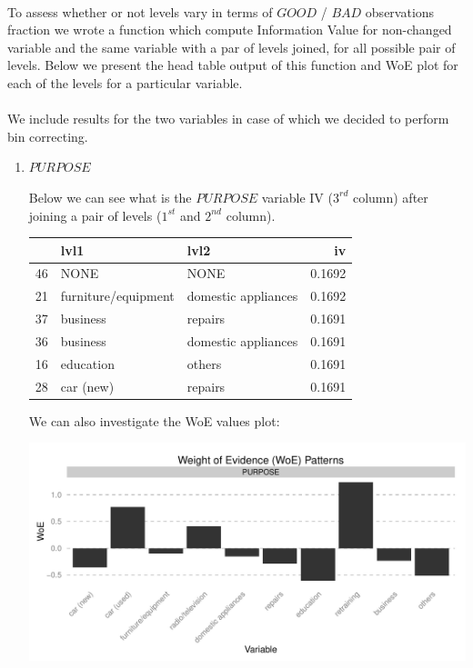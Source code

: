 \documentclass[10pt]{article}\usepackage[]{graphicx}\usepackage[]{color}
\newenvironment{knitrout}{}{} %
\begin{document}
\paragraph{}
To assess whether or not levels vary in terms of $GOOD$ / $BAD$ observations fraction we wrote a function which compute Information Value for non-changed variable and the same variable with a par of levels joined, for all possible pair of levels. Below we present the head table output of this function and WoE plot for each of the levels for a particular variable.
\paragraph{}
We include results for the two variables in case of which we decided to perform bin correcting. 

\begin{enumerate}
\item $PURPOSE$



Below we can see what is the $PURPOSE$ variable IV ($3^{rd}$ column) after joining a pair of levels ($1^{st}$ and $2^{nd}$ column). 

\begin{knitrout}
\color{fgcolor}
\begin{tabular}{l|l|l|r}
\hline
  & lvl1 & lvl2 & iv\\
\hline
46 & NONE & NONE & 0.1692\\
\hline
21 & furniture/equipment & domestic appliances & 0.1692\\
\hline
37 & business & repairs & 0.1691\\
\hline
36 & business & domestic appliances & 0.1691\\
\hline
16 & education & others & 0.1691\\
\hline
28 & car (new) & repairs & 0.1691\\
\hline
\end{tabular}


\end{knitrout}

We can also investigate the WoE values plot: 

\begin{knitrout}
\color{fgcolor}
\includegraphics[width=.65\linewidth]{figure/unnamed-chunk-10-1} 


\end{knitrout}
\end{enumerate}
\end{document}
